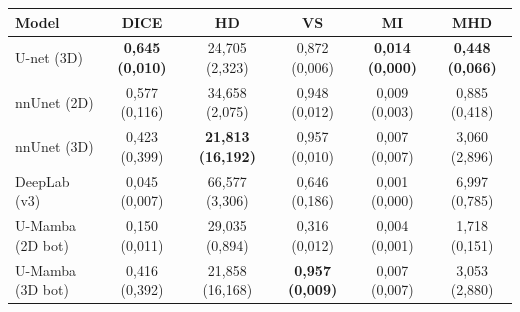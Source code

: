 \begin{tabular}{l c c c c c}
 \hline
Model & DICE & HD & VS & MI & MHD \\ \hline
U-net (3D) & \textbf{0,645 (0,010)} & 24,705 (2,323) & 0,872 (0,006) & \textbf{0,014 (0,000)} & \textbf{0,448 (0,066)} \\ 
nnUnet (2D) & 0,577 (0,116) & 34,658 (2,075) & 0,948 (0,012) & 0,009 (0,003) & 0,885 (0,418) \\ 
nnUnet (3D) & 0,423 (0,399) & \textbf{21,813 (16,192)} & 0,957 (0,010) & 0,007 (0,007) & 3,060 (2,896) \\ 
DeepLab (v3) & 0,045 (0,007) & 66,577 (3,306) & 0,646 (0,186) & 0,001 (0,000) & 6,997 (0,785) \\ 
U-Mamba (2D bot) & 0,150 (0,011) & 29,035 (0,894) & 0,316 (0,012) & 0,004 (0,001) & 1,718 (0,151) \\ 
U-Mamba (3D bot) & 0,416 (0,392) & 21,858 (16,168) & \textbf{0,957 (0,009)} & 0,007 (0,007) & 3,053 (2,880) \\ 
\hline 
 \end{tabular}
